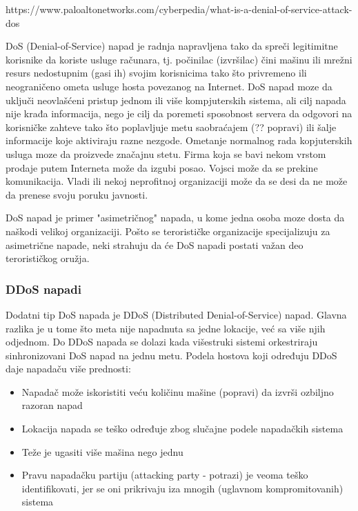 \documentclass[a4paper]{article}
\begin{document}
https://www.paloaltonetworks.com/cyberpedia/what-is-a-denial-of-service-attack-dos

DoS (Denial-of-Service) napad je radnja napravljena tako da spreči legitimitne korisnike da koriste usluge računara, tj. počinilac (izvršilac) čini mašinu ili mrežni resurs nedostupnim (gasi ih) svojim korisnicima tako što privremeno ili neograničeno ometa usluge hosta povezanog na Internet. DoS napad moze da uključi neovlašćeni pristup jednom ili više kompjuterskih sistema, ali cilj napada nije krađa informacija, nego je cilj da poremeti sposobnost servera da odgovori na korisničke zahteve tako što poplavljuje metu saobraćajem (?? popravi) ili šalje informacije koje aktiviraju razne nezgode. Ometanje normalnog rada kopjuterskih usluga moze da proizvede značajnu stetu. Firma koja se bavi nekom vrstom prodaje putem Interneta može da izgubi posao. Vojsci može da se prekine komunikacija. Vladi ili nekoj neprofitnoj organizaciji može da se desi da ne može da prenese svoju poruku javnosti.

DoS napad je primer "asimetričnog" napada, u kome jedna osoba moze dosta da naškodi velikoj organizaciji. Pošto se terorističke organizacije specijalizuju za asimetrične napade, neki strahuju da će DoS napadi postati važan deo terorističkog oružja.

\subsubsection{DDoS napadi}
\label{subsubsec:DDoS}

Dodatni tip DoS napada je DDoS (Distributed Denial-of-Service) napad. Glavna razlika je u tome što meta nije napadnuta sa jedne lokacije, već sa više njih odjednom. Do DDoS napada se dolazi kada višestruki sistemi orkestriraju sinhronizovani DoS napad na jednu metu. Podela hostova koji određuju DDoS daje napadaču više prednosti:
\begin{itemize}
\item Napadač može iskoristiti veću količinu mašine (popravi) da izvrši ozbiljno razoran napad
\item Lokacija napada se teško određuje zbog slučajne podele napadačkih sistema
\item Teže je ugasiti više mašina nego jednu
\item Pravu napadačku partiju (attacking party - potrazi) je veoma teško identifikovati, jer se oni prikrivaju iza mnogih (uglavnom kompromitovanih) sistema
\end{itemize}
\end{document}
